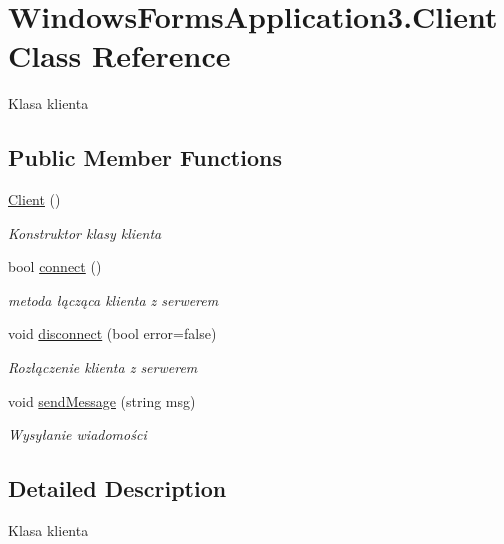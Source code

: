\hypertarget{class_windows_forms_application3_1_1_client}{}\section{Windows\+Forms\+Application3.\+Client Class Reference}
\label{class_windows_forms_application3_1_1_client}


Klasa klienta  


\subsection*{Public Member Functions}
\begin{DoxyCompactItemize}
\item 
\hyperlink{class_windows_forms_application3_1_1_client_a3ac0d5af309fb79e24fc58bd4d17a2b4}{Client} ()
\begin{DoxyCompactList}\small\item\em Konstruktor klasy klienta \end{DoxyCompactList}\item 
bool \hyperlink{class_windows_forms_application3_1_1_client_a9f9dfff8bba1fe20ca6d3da7cd706dd1}{connect} ()
\begin{DoxyCompactList}\small\item\em metoda łącząca klienta z serwerem \end{DoxyCompactList}\item 
void \hyperlink{class_windows_forms_application3_1_1_client_a136f39388b24a7e5bc498baefecd006d}{disconnect} (bool error=false)
\begin{DoxyCompactList}\small\item\em Rozłączenie klienta z serwerem \end{DoxyCompactList}\item 
void \hyperlink{class_windows_forms_application3_1_1_client_afcd6a12a5559cce41c20dba36bce0bc4}{send\+Message} (string msg)
\begin{DoxyCompactList}\small\item\em Wysyłanie wiadomości \end{DoxyCompactList}\end{DoxyCompactItemize}


\subsection{Detailed Description}
Klasa klienta 



